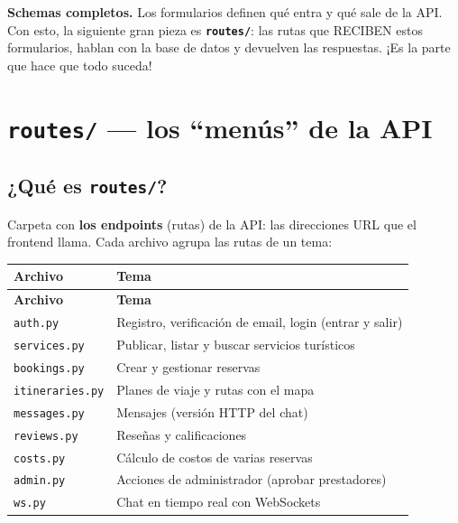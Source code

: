 \documentclass[11pt,a4paper]{article}
\begin{document}
\begin{recuadro}
\textbf{Schemas completos.} Los formularios definen qué entra y qué sale de la API.
Con esto, la siguiente gran pieza es \textbf{\texttt{routes/}}: las rutas que RECIBEN estos
formularios, hablan con la base de datos y devuelven las respuestas. ¡Es la parte que hace
que todo suceda!
\end{recuadro}

\section{\texttt{routes/} --- los ``menús'' de la API}

\subsection{¿Qué es \texttt{routes/}?}

Carpeta con \textbf{los endpoints} (rutas) de la API: las direcciones URL que el frontend
llama. Cada archivo agrupa las rutas de un tema:

\begin{center}
{\small
\setlength{\tabcolsep}{4pt}
\begin{longtable}{@{}>{\raggedright\arraybackslash}p{3.6cm}>{\raggedright\arraybackslash}p{11.3cm}@{}}
\toprule
\textbf{Archivo} & \textbf{Tema} \\
\midrule
\endfirsthead
\toprule
\textbf{Archivo} & \textbf{Tema} \\
\midrule
\endhead
\texttt{auth.py} & Registro, verificación de email, login (entrar y salir) \\
\texttt{services.py} & Publicar, listar y buscar servicios turísticos \\
\texttt{bookings.py} & Crear y gestionar reservas \\
\texttt{itineraries.py} & Planes de viaje y rutas con el mapa \\
\texttt{messages.py} & Mensajes (versión HTTP del chat) \\
\texttt{reviews.py} & Reseñas y calificaciones \\
\texttt{costs.py} & Cálculo de costos de varias reservas \\
\texttt{admin.py} & Acciones de administrador (aprobar prestadores) \\
\texttt{ws.py} & Chat en tiempo real con WebSockets \\
\bottomrule
\end{longtable}
}
\end{center}
\end{document}
